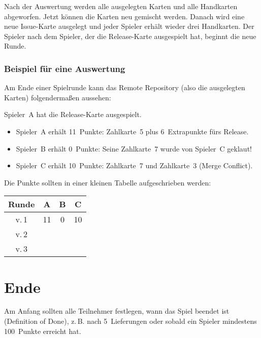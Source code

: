 \documentclass[DIV=15, fontsize=11pt]{gitgame}
\begin{document}
Nach der Auswertung werden alle ausgelegten Karten und alle Handkarten abgeworfen. Jetzt können die Karten neu gemischt werden. Danach wird eine neue Issue-Karte ausgelegt und jeder Spieler erhält wieder drei Handkarten. Der Spieler nach dem Spieler, der die Release-Karte ausgespielt hat, beginnt die neue Runde.


\subsubsection*{Beispiel für eine Auswertung}
Am Ende einer Spielrunde kann das Remote Repository (also die ausgelegten Karten) folgendermaßen aussehen:

\begin{center}
\end{center}

Spieler~A hat die Release-Karte ausgespielt.
\begin{itemize}
	\item Spieler~A erhält 11~Punkte: Zahlkarte~5 plus 6~Extrapunkte fürs Release.
	\item Spieler~B erhält 0~Punkte: Seine Zahlkarte~7 wurde von Spieler~C geklaut!
	\item Spieler~C erhält 10~Punkte: Zahlkarte~7 und Zahlkarte~3 (Merge Conflict).
\end{itemize}

Die Punkte sollten in einer kleinen Tabelle aufgeschrieben werden:

\begin{center}
\begin{tabular}{c|c|c|c}
	Runde & A & B & C \\
	\hline
	v.\,1 & 11 & 0 & 10 \\
	\hline
	v.\,2 &  & & \\
	\hline
	v.\,3 &  & & \\
\end{tabular}
\end{center}



\section{Ende\label{ende}}
Am Anfang sollten alle Teilnehmer festlegen, wann das Spiel beendet ist (Definition of Done), z.\,B. nach 5~Lieferungen oder sobald ein Spieler mindestens 100~Punkte erreicht hat.
\end{document}
